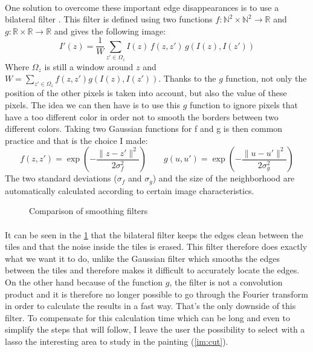 \documentclass[11pt]{article}
\newcommand{\N}{\mathbb{N}}
\newcommand{\R}{\mathbb{R}}
\begin{document}
	\paragraph{}
	One solution to overcome these important edge disappearances is to use a bilateral filter \cite{bil}. This filter is defined using two functions $f: \N^2 \times \N^2 \rightarrow \R$ and $g: \R \times \R \rightarrow \R$ and gives the following image:
	$$ I'(z) = \dfrac{1}{W} \sum_{z' \in \Omega_{z}} I(z) \, f(z, z') \, g \left( I(z), I(z') \right) $$
	Where $\Omega_{z}$ is still a window around $z$ and $W = \sum_{z' \in \Omega_{z}} f(z, z') g(I(z), I(z'))$. Thanks to the $g$ function, not only the position of the other pixels is taken into account, but also the value of these pixels. The idea we can then have is to use this $g$ function to ignore pixels that have a too different color in order not to smooth the borders between two different colors. Taking two Gaussian functions for f and g is then common practice and that is the choice I made:
	$$ f(z, z') = \exp \left( - \dfrac{\| z - z'\|^2}{2 \sigma_f^2} \right) \qquad g(u, u') = \exp \left( - \dfrac{\| u - u'\|^2}{2 \sigma_g^2} \right) $$
	The two standard deviations ($\sigma_f$ and $\sigma_g$) and the size of the neighborhood are automatically calculated according to certain image characteristics.
	
	\begin{figure}[h]
		\centering
		\vspace{-1mm}
		\caption{Comparison of smoothing filters}
		\label{im:smooths}
	\end{figure}
	\vspace{-1mm}

	\paragraph{}
	It can be seen in the \figurename \ref{im:smooths} that the bilateral filter keeps the edges clean between the tiles and that the noise inside the tiles is erased. This filter therefore does exactly what we want it to do, unlike the Gaussian filter which smooths the edges between the tiles and therefore makes it difficult to accurately locate the edges. On the other hand because of the function $g$, the filter is not a convolution product and it is therefore no longer possible to go through the Fourier transform in order to calculate the results in a fast way. That's the only downside of this filter. To compensate for this calculation time which can be long and even to simplify the steps that will follow, I leave the user the possibility to select with a lasso the interesting area to study in the painting (\figurename \ref{im:cut}).
	
\end{document}
